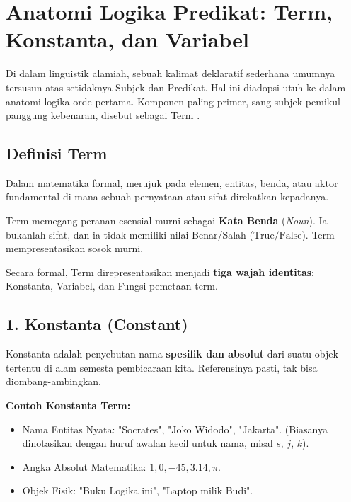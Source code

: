 \section{Anatomi Logika Predikat: Term, Konstanta, dan Variabel}

Di dalam linguistik alamiah, sebuah kalimat deklaratif sederhana umumnya tersusun atas setidaknya Subjek dan Predikat. Hal ini diadopsi utuh ke dalam anatomi logika orde pertama. Komponen paling primer, sang subjek pemikul panggung kebenaran, disebut sebagai Term \cite{rosen2019}.

\subsection{Definisi Term}

\begin{definisi}[Term]
Dalam matematika formal,  merujuk pada elemen, entitas, benda, atau aktor fundamental di mana sebuah pernyataan atau sifat direkatkan kepadanya.
\end{definisi}

Term memegang peranan esensial murni sebagai \textbf{Kata Benda} (\textit{Noun}). Ia bukanlah sifat, dan ia tidak memiliki nilai Benar/Salah ($\text{True}/\text{False}$). Term mempresentasikan sosok murni.

Secara formal, Term direpresentasikan menjadi \textbf{tiga wajah identitas}: Konstanta, Variabel, dan Fungsi pemetaan term.

\subsection{1. Konstanta (Constant)}

Konstanta adalah penyebutan nama \textbf{spesifik dan absolut} dari suatu objek tertentu di alam semesta pembicaraan kita. Referensinya pasti, tak bisa diombang-ambingkan.

\begin{contoh}
\textbf{Contoh Konstanta Term:}
\begin{itemize}
    \item Nama Entitas Nyata: "Socrates", "Joko Widodo", "Jakarta". (Biasanya dinotasikan dengan huruf awalan kecil untuk nama, misal $s$, $j$, $k$).
    \item Angka Absolut Matematika: $1, 0, -45, 3.14, \pi$.
    \item Objek Fisik: "Buku Logika ini", "Laptop milik Budi".
\end{itemize}
\end{contoh}

